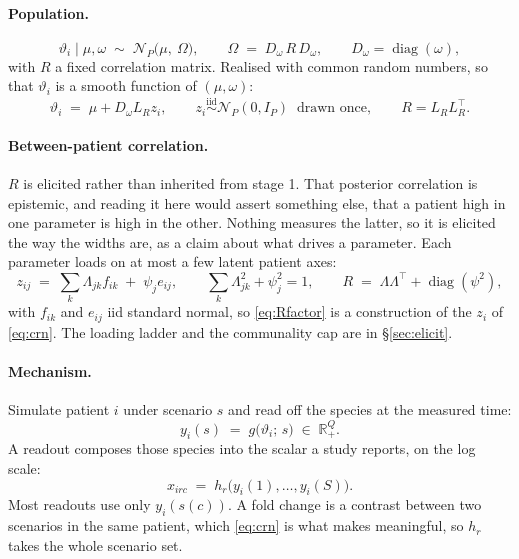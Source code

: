 \documentclass[11pt]{article}
\newcommand{\Ncal}{\mathcal{N}}
\newcommand{\Tr}{^{\!\top}}
\DeclareMathOperator{\diag}{diag}
\begin{document}
\paragraph{Population.}
\begin{equation}
\vartheta_i \mid \mu,\omega \;\sim\; \Ncal_P\big(\mu,\ \Omega\big),
\qquad
\Omega \;=\; D_\omega\,R\,D_\omega,
\qquad
D_\omega=\diag(\omega),
\label{eq:pop}
\end{equation}
with $R$ a fixed correlation matrix. Realised with common random numbers, so
that $\vartheta_i$ is a smooth function of $(\mu,\omega)$:
\begin{equation}
\vartheta_i \;=\; \mu + D_\omega L_R z_i,
\qquad
z_i \stackrel{\text{iid}}{\sim} \Ncal_P(0,I_P) \ \text{ drawn once},
\qquad
R = L_R L_R\Tr .
\label{eq:crn}
\end{equation}

\paragraph{Between-patient correlation.} $R$ is elicited rather than inherited
from stage 1. That posterior correlation is epistemic, and reading it here would
assert something else, that a patient high in one parameter is high in the other.
Nothing measures the latter, so it is elicited the way the widths are, as a claim
about what drives a parameter. Each parameter loads on at most a few latent
patient axes:
\begin{equation}
z_{ij} \;=\; \sum_{k} \Lambda_{jk} f_{ik} \;+\; \psi_j e_{ij},
\qquad
\sum_{k}\Lambda_{jk}^2 + \psi_j^2 = 1,
\qquad
R \;=\; \Lambda\Lambda\Tr + \diag(\psi^2),
\label{eq:Rfactor}
\end{equation}
with $f_{ik}$ and $e_{ij}$ iid standard normal, so \eqref{eq:Rfactor} is a
construction of the $z_i$ of \eqref{eq:crn}. The loading ladder and the
communality cap are in \S\ref{sec:elicit}.

\paragraph{Mechanism.} Simulate patient $i$ under scenario $s$ and read off the
species at the measured time:
\begin{equation}
y_i(s) \;=\; g\big(\vartheta_i;\,s\big) \;\in\; \mathbb{R}^Q_{+} .
\label{eq:mech}
\end{equation}
A readout composes those species into the scalar a study reports, on the log
scale:
\begin{equation}
x_{irc} \;=\; h_r\big(y_i(1),\dots,y_i(S)\big).
\label{eq:readout}
\end{equation}
Most readouts use only $y_i(s(c))$. A fold change is a contrast between two
scenarios in the same patient, which \eqref{eq:crn} is what makes meaningful, so
$h_r$ takes the whole scenario set.
\end{document}
